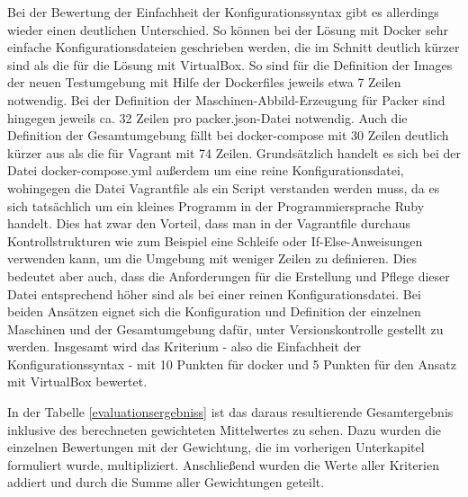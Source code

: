 Bei der Bewertung der Einfachheit der Konfigurationssyntax gibt es allerdings wieder einen deutlichen Unterschied. So können bei der Lösung mit Docker sehr einfache Konfigurationsdateien geschrieben werden, die im Schnitt deutlich kürzer sind als die für die Lösung mit VirtualBox. So sind für die Definition der Images der neuen Testumgebung mit Hilfe der Dockerfiles jeweils etwa 7 Zeilen notwendig. Bei der Definition der Maschinen-Abbild-Erzeugung für Packer sind hingegen jeweils ca. 32 Zeilen pro packer.json-Datei notwendig. Auch die Definition der Gesamtumgebung fällt bei docker-compose mit 30 Zeilen deutlich kürzer aus als die für Vagrant mit 74 Zeilen. Grundsätzlich handelt es sich bei der Datei docker-compose.yml außerdem um eine reine Konfigurationsdatei, wohingegen die Datei Vagrantfile als ein Script verstanden werden muss, da es sich tatsächlich um ein kleines Programm in der Programmiersprache Ruby handelt. Dies hat zwar den Vorteil, dass man in der Vagrantfile durchaus Kontrollstrukturen wie zum Beispiel eine Schleife oder If-Else-Anweisungen verwenden kann, um die Umgebung mit weniger Zeilen zu definieren. Dies bedeutet aber auch, dass die Anforderungen für die Erstellung und Pflege dieser Datei entsprechend höher sind als bei einer reinen Konfigurationsdatei. Bei beiden Ansätzen eignet sich die Konfiguration und Definition der einzelnen Maschinen und der Gesamtumgebung dafür, unter Versionskontrolle gestellt zu werden. Insgesamt wird das Kriterium - also die Einfachheit der Konfigurationssyntax - mit 10 Punkten für docker und 5 Punkten für den Ansatz mit VirtualBox bewertet.

In der Tabelle \ref{evaluationsergebniss} ist das daraus resultierende Gesamtergebnis inklusive des berechneten gewichteten Mittelwertes zu sehen. Dazu wurden die einzelnen Bewertungen mit der Gewichtung, die im vorherigen Unterkapitel formuliert wurde, multipliziert. Anschließend wurden die Werte aller Kriterien addiert und durch die Summe aller Gewichtungen geteilt.

